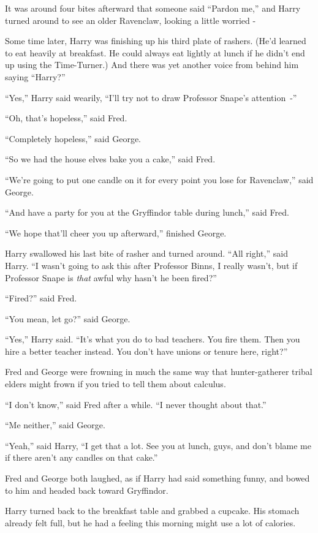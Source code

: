 It was around four bites afterward that someone said ``Pardon me,'' and Harry turned around to see an older Ravenclaw, looking a little worried -

Some time later, Harry was finishing up his third plate of rashers. (He'd learned to eat heavily at breakfast. He could always eat lightly at lunch if he didn't end up using the Time-Turner.) And there was yet another voice from behind him saying ``Harry?''

``Yes,'' Harry said wearily, ``I'll try not to draw Professor Snape's attention~-''

``Oh, that's hopeless,'' said Fred.

``Completely hopeless,'' said George.

``So we had the house elves bake you a cake,'' said Fred.

``We're going to put one candle on it for every point you lose for Ravenclaw,'' said George.

``And have a party for you at the Gryffindor table during lunch,'' said Fred.

``We hope that'll cheer you up afterward,'' finished George.

Harry swallowed his last bite of rasher and turned around. ``All right,'' said Harry. ``I wasn't going to ask this after Professor Binns, I really wasn't, but if Professor Snape is \emph{that} awful why hasn't he been fired?''

``Fired?'' said Fred.

``You mean, let go?'' said George.

``Yes,'' Harry said. ``It's what you do to bad teachers. You fire them. Then you hire a better teacher instead. You don't have unions or tenure here, right?''

Fred and George were frowning in much the same way that hunter-gatherer tribal elders might frown if you tried to tell them about calculus.

``I don't know,'' said Fred after a while. ``I never thought about that.''

``Me neither,'' said George.

``Yeah,'' said Harry, ``I get that a lot. See you at lunch, guys, and don't blame me if there aren't any candles on that cake.''

Fred and George both laughed, as if Harry had said something funny, and bowed to him and headed back toward Gryffindor.

Harry turned back to the breakfast table and grabbed a cupcake. His stomach already felt full, but he had a feeling this morning might use a lot of calories.

